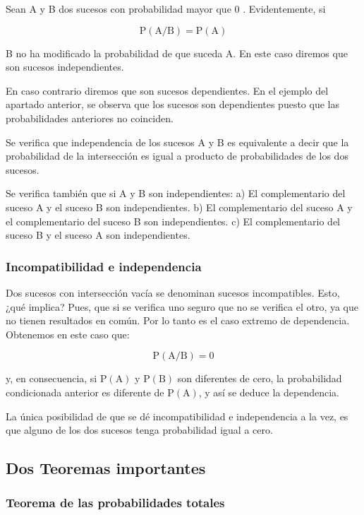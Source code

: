 \documentclass[
]{article}
\begin{document}
Sean A y B dos sucesos con probabilidad mayor que 0 . Evidentemente, si

\[
\mathrm{P}(\mathrm{A} / \mathrm{B})=\mathrm{P}(\mathrm{A})
\]

B no ha modificado la probabilidad de que suceda A. En este caso diremos
que son sucesos independientes.

En caso contrario diremos que son sucesos dependientes. En el ejemplo
del apartado anterior, se observa que los sucesos son dependientes
puesto que las probabilidades anteriores no coinciden.

Se verifica que independencia de los sucesos A y B es equivalente a
decir que la probabilidad de la intersección es igual a producto de
probabilidades de los dos sucesos.

Se verifica también que si A y B son independientes: a) El
complementario del suceso A y el suceso B son independientes. b) El
complementario del suceso A y el complementario del suceso B son
independientes. c) El complementario del suceso B y el suceso A son
independientes.

\subsubsection{Incompatibilidad e independencia}\label{incompatibilidad-e-independencia}

Dos sucesos con intersección vacía se denominan sucesos incompatibles.
Esto, ¿qué implica? Pues, que si se verifica uno seguro que no se
verifica el otro, ya que no tienen resultados en común. Por lo tanto es
el caso extremo de dependencia. Obtenemos en este caso que:

\[
\mathrm{P}(\mathrm{A} / \mathrm{B})=0
\]

y, en consecuencia, si \(\mathrm{P}(\mathrm{A})\) y
\(\mathrm{P}(\mathrm{B})\) son diferentes de cero, la probabilidad
condicionada anterior es diferente de \(\mathrm{P}(\mathrm{A})\), y así se
deduce la dependencia.

La única posibilidad de que se dé incompatibilidad e independencia a la
vez, es que alguno de los dos sucesos tenga probabilidad igual a cero.

\subsection{Dos Teoremas importantes}\label{dos-teoremas-importantes}

\subsubsection{Teorema de las probabilidades totales}\label{teorema-de-las-probabilidades-totales}
\end{document}
